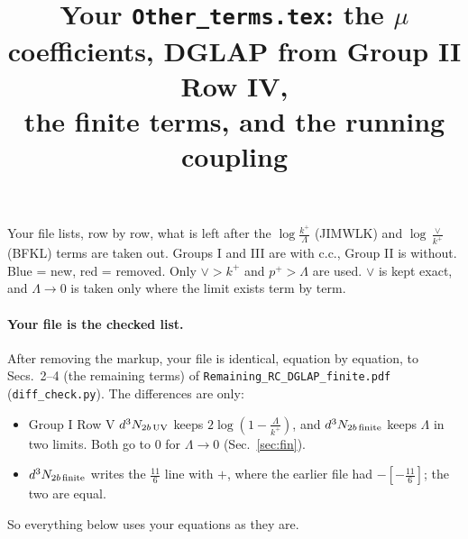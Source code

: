 \documentclass[10pt]{article}
\title{Your \texttt{Other\_terms.tex}: the $\mu$ coefficients, DGLAP from Group II Row IV,\\ the finite terms, and the running coupling}
\date{}
\numberwithin{equation}{section}
\newcommand{\new}[1]{{\color{blue}#1}}
\newcommand{\old}[1]{{\color{red}#1}}
\begin{document}
\maketitle
\noindent Your file lists, row by row, what is left after the $\log\frac{k^+}{\Lambda}$ (JIMWLK) and $\log\frac{\vee}{k^+}$ (BFKL) terms are taken out. Groups I and III are with c.c., Group II is without. \new{Blue} = new, \old{red} = removed. Only $\vee>k^+$ and $p^+>\Lambda$ are used. $\vee$ is kept exact, and $\Lambda\to0$ is taken only where the limit exists term by term.

\paragraph{Your file is the checked list.} After removing the markup, your file is identical, equation by equation, to Secs.~2--4 (the remaining terms) of \texttt{Remaining\_RC\_DGLAP\_finite.pdf} (\texttt{diff\_check.py}). The differences are only:
\begin{itemize}
\item Group I Row V $d^3N_{2b\,\rm UV}$ keeps $2\log(1-\frac{\Lambda}{k^+})$, and $d^3N_{2b\,\rm finite}$ keeps $\Lambda$ in two limits. Both go to $0$ for $\Lambda\to0$ (Sec.~\ref{sec:fin}).
\item $d^3N_{2b\,\rm finite}$ writes the $\frac{11}{6}$ line with $+$, where the earlier file had $-[-\frac{11}{6}]$; the two are equal.
\end{itemize}
So everything below uses your equations as they are.
\end{document}
